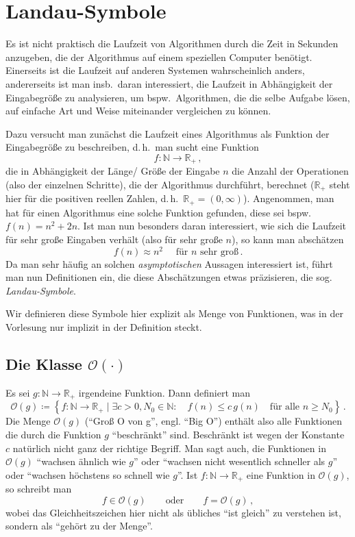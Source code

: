 \documentclass[fontsize=12pt,paper=14,div=calc,parskip=full]{scrartcl}
\def\N{\mathbb{N}}
\def\R{\mathbb{R}}
\begin{document}
\section*{Landau-Symbole}
Es ist nicht praktisch die Laufzeit von Algorithmen durch die Zeit in
Sekunden anzugeben, die der Algorithmus auf einem speziellen Computer
benötigt. Einerseits ist die Laufzeit auf anderen Systemen
wahrscheinlich anders, andererseits ist man insb.\ daran interessiert,
die Laufzeit in Abhängigkeit der Eingabegröße zu analysieren, um
bspw.\ Algorithmen, die die selbe Aufgabe lösen, auf einfache Art und 
Weise miteinander vergleichen zu können.

Dazu versucht man zunächst die Laufzeit eines Algorithmus als Funktion
der Eingabegröße zu beschreiben, d.\,h.\ man sucht eine Funktion
\[
  f : \N \rightarrow \R_+ \,,
\]
die in Abhängigkeit der Länge/ Größe der Eingabe $n$ die Anzahl der
Operationen (also der einzelnen Schritte), die der Algorithmus
durchführt, berechnet ($\R_+$ steht hier für die positiven reellen
Zahlen, d.\,h.\ $\R_+ = (0, \infty)$). Angenommen, man hat für einen
Algorithmus eine solche Funktion gefunden, diese sei bspw.
$f(n) = n^2 + 2n$. Ist man nun besonders daran interessiert, wie sich
die Laufzeit für sehr große Eingaben verhält (also für sehr große
$n$), so kann man abschätzen
\[
  f(n) \approx n^2 \quad \text{ für } n \text{ sehr groß}\,.
\]
Da man sehr häufig an solchen \emph{asymptotischen} Aussagen
interessiert ist, führt man nun Definitionen ein, die diese
Abschätzungen etwas präzisieren, die sog. \emph{Landau-Symbole}.

Wir definieren diese Symbole hier explizit als Menge von Funktionen,
was in der Vorlesung nur implizit in der Definition steckt.

\subsection*{Die Klasse $\mathcal{O}(\cdot)$}
Es sei $g : \N \rightarrow \R_+$ irgendeine Funktion. Dann definiert
man
\[
  \mathcal{O}(g) \coloneqq \left\{ f : \N \rightarrow \R_+ \mid
    \exists c > 0, N_0 \in \N: \quad f(n) \le c\,g(n) \quad \text{für
      alle } n \ge N_0 \right\} \,.
\]
Die Menge $\mathcal{O}(g)$ (``Groß O von g'', engl. ``Big O'') enthält
also alle Funktionen die durch die Funktion $g$ ``beschränkt''
sind. Beschränkt ist wegen der Konstante $c$ natürlich nicht ganz der
richtige Begriff. Man sagt auch, die Funktionen in $\mathcal{O}(g)$
``wachsen ähnlich wie $g$'' oder ``wachsen nicht wesentlich schneller
als $g$'' oder ``wachsen höchstens so schnell wie $g$''. Ist
$f : \N \rightarrow \R_+$ eine Funktion in $\mathcal{O}(g)$, so
schreibt man
\[
  f \in \mathcal{O}(g) \qquad \text{oder} \qquad f = \mathcal{O}(g)
  \,,
\]
wobei das Gleichheitszeichen hier nicht als übliches ``ist gleich'' zu
verstehen ist, sondern als ``gehört zu der Menge''.
\end{document}
